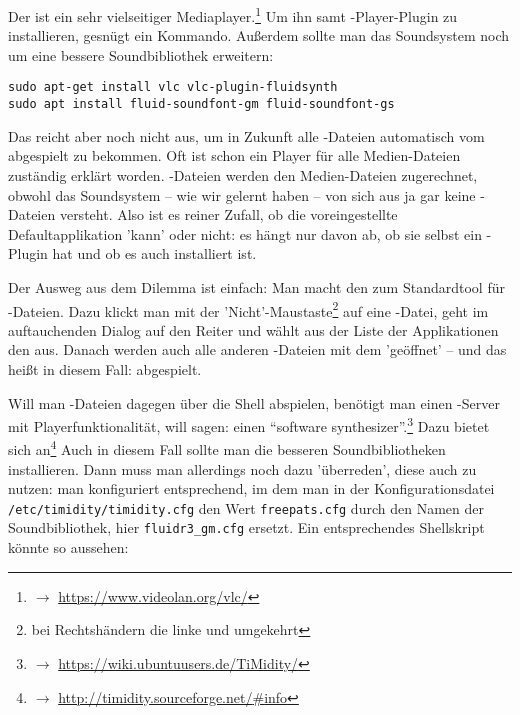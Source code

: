 Der  ist ein sehr vielseitiger Mediaplayer.\footnote{$\rightarrow$
\href{https://www.videolan.org/vlc/}{https://www.videolan.org/vlc/}} Um ihn samt
-Player-Plugin zu installieren, gesnügt ein Kommando. Außerdem sollte
man das Soundsystem noch um eine bessere Soundbibliothek erweitern:

\begin{verbatim}
sudo apt-get install vlc vlc-plugin-fluidsynth
sudo apt install fluid-soundfont-gm fluid-soundfont-gs
\end{verbatim}

Das reicht aber noch nicht aus, um in Zukunft alle -Dateien
automatisch vom  abgespielt zu bekommen. Oft ist schon ein Player für
alle Medien-Dateien zuständig erklärt worden. -Dateien werden den
Medien-Dateien zugerechnet, obwohl das Soundsystem -- wie wir gelernt haben --
von sich aus ja gar keine -Dateien versteht. Also ist es reiner
Zufall, ob die voreingestellte Defaultapplikation  'kann' oder nicht:
es hängt nur davon ab, ob sie selbst ein -Plugin hat und ob es auch
installiert ist.

Der Ausweg aus dem Dilemma ist einfach: Man macht den  zum Standardtool
für -Dateien. Dazu klickt man mit der 'Nicht'-Maustaste\footnote{bei
Rechtshändern die linke und umgekehrt} auf eine -Datei, geht im
auftauchenden Dialog auf den Reiter  und wählt aus der Liste der
Applikationen den   aus. Danach werden auch alle anderen
-Dateien mit dem   'geöffnet' -- und das heißt in diesem
Fall: abgespielt.

Will man -Dateien dagegen über die Shell abspielen, benötigt man einen
-Server mit Playerfunktionalität, will sagen: einen \enquote{software
synthesizer}.\footnote{$\rightarrow$
\href{https://wiki.ubuntuusers.de/TiMidity/}{https://wiki.ubuntuusers.de/TiMidity/}}
Dazu bietet sich  an\footnote{$\rightarrow$
\href{http://timidity.sourceforge.net/{\#}info}{http://timidity.sourceforge.net/{\#}info}}
Auch in diesem Fall sollte man die besseren Soundbibliotheken installieren. Dann
muss man  allerdings noch dazu 'überreden', diese auch zu nutzen:
man konfiguriert  entsprechend, im dem man in der
Konfigurationsdatei \texttt{/etc/timidity/timidity.cfg} den Wert
\texttt{freepats.cfg} durch den Namen der Soundbibliothek, hier
\texttt{fluidr3\_gm.cfg} ersetzt. Ein entsprechendes Shellskript könnte so
aussehen:

